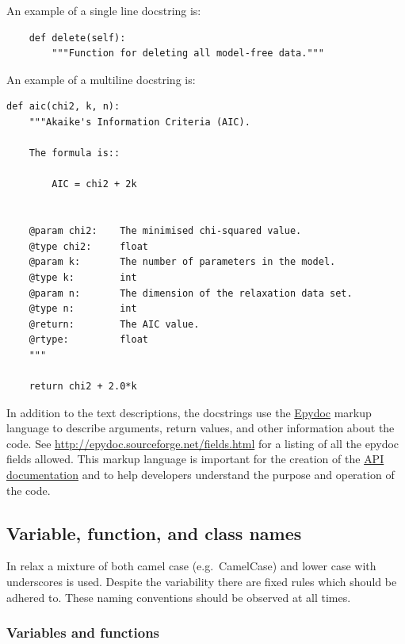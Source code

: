 An example of a single line docstring is:

\begin{lstlisting}
    def delete(self):
        """Function for deleting all model-free data."""
\end{lstlisting}

An example of a multiline docstring is:

\begin{lstlisting}
def aic(chi2, k, n):
    """Akaike's Information Criteria (AIC).

    The formula is::

        AIC = chi2 + 2k


    @param chi2:    The minimised chi-squared value.
    @type chi2:     float
    @param k:       The number of parameters in the model.
    @type k:        int
    @param n:       The dimension of the relaxation data set.
    @type n:        int
    @return:        The AIC value.
    @rtype:         float
    """

    return chi2 + 2.0*k
\end{lstlisting}

In addition to the text descriptions, the docstrings use the \href{http://epydoc.sourceforge.net/}{Epydoc} markup language to describe arguments, return values, and other information about the code.
See \url{http://epydoc.sourceforge.net/fields.html} for a listing of all the epydoc fields allowed.
This markup language is important for the creation of the \href{http://www.nmr-relax.com/api/}{API documentation} and to help developers understand the purpose and operation of the code.


\subsection{Variable, function, and class names}

In relax a mixture of both camel case (e.g.\ CamelCase) and lower case with underscores is used.
Despite the variability there are fixed rules which should be adhered to.
These naming conventions should be observed at all times.



\subsubsection{Variables and functions}

